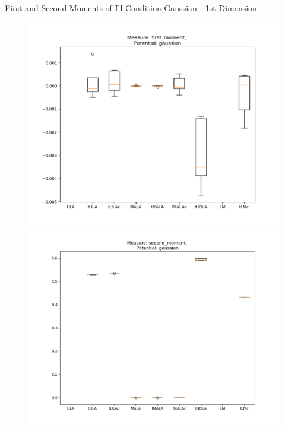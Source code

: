 \documentclass[aspectratio=169]{beamer}
\begin{document}
\begin{frame}{First and Second Moments of Ill-Condition Gaussian - 1st Dimension}%
        \begin{figure}[h]
        \centering
        \begin{minipage}{0.5\linewidth}
          \centering
          \includegraphics[width=0.99\linewidth]{illcond10sBoxPlot1moment100dim01step.png}
        \end{minipage}%
        \begin{minipage}{0.5\linewidth}
          \centering
          \includegraphics[width=0.99\linewidth]{illcond10sBoxPlot2moment100dim01step.png}
        \end{minipage}%
        \end{figure}
\end{frame}
\end{document}
